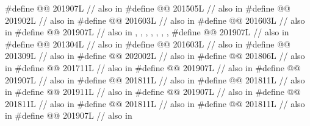 \begin{codeblock}
#define @@                            201907L // also in 
#define @@                     201505L // also in 
#define @@              201902L // also in 
#define @@              201603L // also in 
#define @@                              201603L // also in 
#define @@                           201907L
  // also in , , , , , , , 
#define @@                            201907L // also in 
#define @@                       201304L // also in 
#define @@                             201603L // also in 
#define @@                      201309L // also in 
#define @@                          202002L // also in 
#define @@              201806L // also in 
#define @@                 201711L // also in 
#define @@           201907L // also in 
#define @@              201907L // also in 
#define @@                201811L // also in 
#define @@                  201811L // also in 
#define @@                 201911L // also in 
#define @@                  201907L // also in 
#define @@             201811L // also in 
#define @@                   201811L // also in 
#define @@                 201811L // also in 
#define @@                  201907L // also in 

\end{codeblock}

